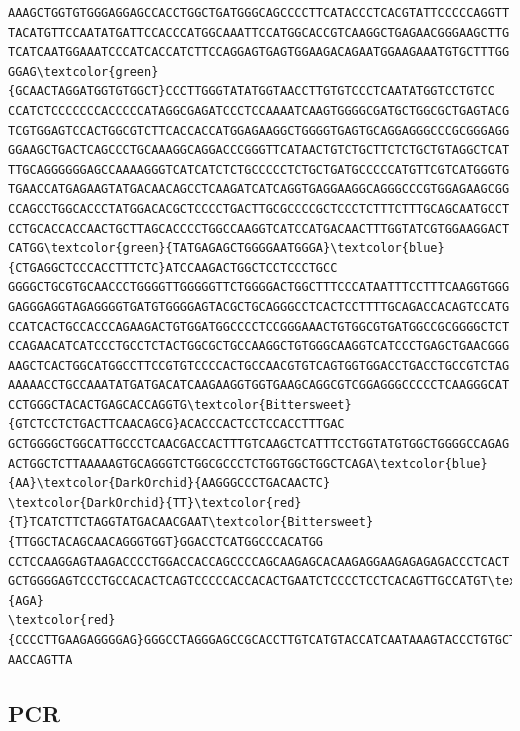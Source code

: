 \documentclass[12pt]{article}
\begin{document}
\begin{Verbatim}[commandchars=\\\{\}]
AAAGCTGGTGTGGGAGGAGCCACCTGGCTGATGGGCAGCCCCTTCATACCCTCACGTATTCCCCCAGGTT
TACATGTTCCAATATGATTCCACCCATGGCAAATTCCATGGCACCGTCAAGGCTGAGAACGGGAAGCTTG
TCATCAATGGAAATCCCATCACCATCTTCCAGGAGTGAGTGGAAGACAGAATGGAAGAAATGTGCTTTGG
GGAG\textcolor{green}{GCAACTAGGATGGTGTGGCT}CCCTTGGGTATATGGTAACCTTGTGTCCCTCAATATGGTCCTGTCC
CCATCTCCCCCCCACCCCCATAGGCGAGATCCCTCCAAAATCAAGTGGGGCGATGCTGGCGCTGAGTACG
TCGTGGAGTCCACTGGCGTCTTCACCACCATGGAGAAGGCTGGGGTGAGTGCAGGAGGGCCCGCGGGAGG
GGAAGCTGACTCAGCCCTGCAAAGGCAGGACCCGGGTTCATAACTGTCTGCTTCTCTGCTGTAGGCTCAT
TTGCAGGGGGGAGCCAAAAGGGTCATCATCTCTGCCCCCTCTGCTGATGCCCCCATGTTCGTCATGGGTG
TGAACCATGAGAAGTATGACAACAGCCTCAAGATCATCAGGTGAGGAAGGCAGGGCCCGTGGAGAAGCGG
CCAGCCTGGCACCCTATGGACACGCTCCCCTGACTTGCGCCCCGCTCCCTCTTTCTTTGCAGCAATGCCT
CCTGCACCACCAACTGCTTAGCACCCCTGGCCAAGGTCATCCATGACAACTTTGGTATCGTGGAAGGACT
CATGG\textcolor{green}{TATGAGAGCTGGGGAATGGGA}\textcolor{blue}{CTGAGGCTCCCACCTTTCTC}ATCCAAGACTGGCTCCTCCCTGCC
GGGGCTGCGTGCAACCCTGGGGTTGGGGGTTCTGGGGACTGGCTTTCCCATAATTTCCTTTCAAGGTGGG
GAGGGAGGTAGAGGGGTGATGTGGGGAGTACGCTGCAGGGCCTCACTCCTTTTGCAGACCACAGTCCATG
CCATCACTGCCACCCAGAAGACTGTGGATGGCCCCTCCGGGAAACTGTGGCGTGATGGCCGCGGGGCTCT
CCAGAACATCATCCCTGCCTCTACTGGCGCTGCCAAGGCTGTGGGCAAGGTCATCCCTGAGCTGAACGGG
AAGCTCACTGGCATGGCCTTCCGTGTCCCCACTGCCAACGTGTCAGTGGTGGACCTGACCTGCCGTCTAG
AAAAACCTGCCAAATATGATGACATCAAGAAGGTGGTGAAGCAGGCGTCGGAGGGCCCCCTCAAGGGCAT
CCTGGGCTACACTGAGCACCAGGTG\textcolor{Bittersweet}{GTCTCCTCTGACTTCAACAGCG}ACACCCACTCCTCCACCTTTGAC
GCTGGGGCTGGCATTGCCCTCAACGACCACTTTGTCAAGCTCATTTCCTGGTATGTGGCTGGGGCCAGAG
ACTGGCTCTTAAAAAGTGCAGGGTCTGGCGCCCTCTGGTGGCTGGCTCAGA\textcolor{blue}{AA}\textcolor{DarkOrchid}{AAGGGCCCTGACAACTC}
\textcolor{DarkOrchid}{TT}\textcolor{red}{T}TCATCTTCTAGGTATGACAACGAAT\textcolor{Bittersweet}{TTGGCTACAGCAACAGGGTGGT}GGACCTCATGGCCCACATGG
CCTCCAAGGAGTAAGACCCCTGGACCACCAGCCCCAGCAAGAGCACAAGAGGAAGAGAGAGACCCTCACT
GCTGGGGAGTCCCTGCCACACTCAGTCCCCCACCACACTGAATCTCCCCTCCTCACAGTTGCCATGT\textcolor{red}{AGA}
\textcolor{red}{CCCCTTGAAGAGGGGAG}GGGCCTAGGGAGCCGCACCTTGTCATGTACCATCAATAAAGTACCCTGTGCTC
AACCAGTTA
		\end{Verbatim}
		\subsection{PCR}
\end{document}
